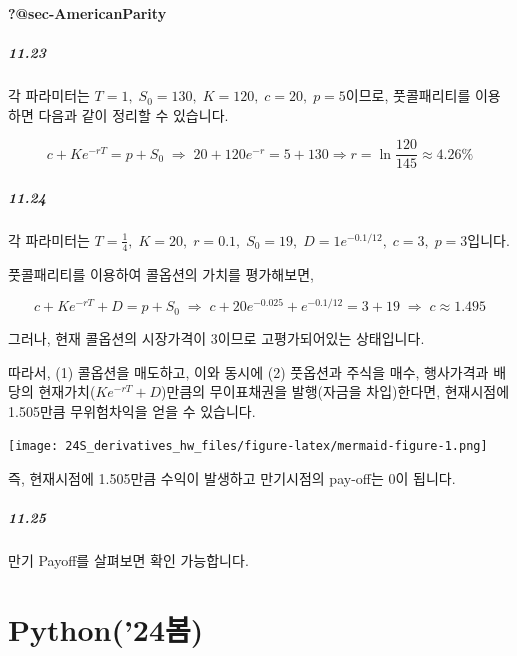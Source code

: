 \documentclass[
  letterpaper,
  DIV=11,
  numbers=noendperiod]{scrreprt}
\begin{document}
\textbf{?@sec-AmericanParity}

\subsubsection*{\texorpdfstring{\textbf{11.23}}{11.23}}\label{section-4}

각 파라미터는 \(T=1,\;S_0=130,\;K=120,\;c=20,\;p=5\)이므로, 풋콜패리티를
이용하면 다음과 같이 정리할 수 있습니다.

\[c+Ke^{-rT}=p+S_0\;\Rightarrow\;20+120e^{-r}=5+130 \Rightarrow r=\ln{\frac{120}{145}}\approx 4.26\%\]

\subsubsection*{\texorpdfstring{\textbf{11.24}}{11.24}}\label{section-5}

각 파라미터는
\(T=\frac{1}{4},\;K=20,\;r=0.1,\;S_0=19,\;D=1e^{-0.1/12},\;c=3,\;p=3\)입니다.

풋콜패리티를 이용하여 콜옵션의 가치를 평가해보면,

\[c+Ke^{-rT}+D=p+S_0\;\Rightarrow\;c+20e^{-0.025}+e^{-0.1/12}=3+19\;\Rightarrow\;c\approx 1.495\]

그러나, 현재 콜옵션의 시장가격이 3이므로 고평가되어있는 상태입니다.

따라서, (1) 콜옵션을 매도하고, 이와 동시에 (2) 풋옵션과 주식을 매수,
행사가격과 배당의 현재가치(\(Ke^{-rT}+D\))만큼의 무이표채권을
발행(자금을 차입)한다면, 현재시점에 1.505만큼 무위험차익을 얻을 수
있습니다.

\texttt{[image: 24S\_derivatives\_hw\_files/figure-latex/mermaid-figure-1.png]}

즉, 현재시점에 1.505만큼 수익이 발생하고 만기시점의 pay-off는 0이
됩니다.

\subsubsection*{\texorpdfstring{\textbf{11.25}}{11.25}}\label{section-6}

만기 Payoff를 살펴보면 확인 가능합니다.

\part{Python('24봄)}
\end{document}
